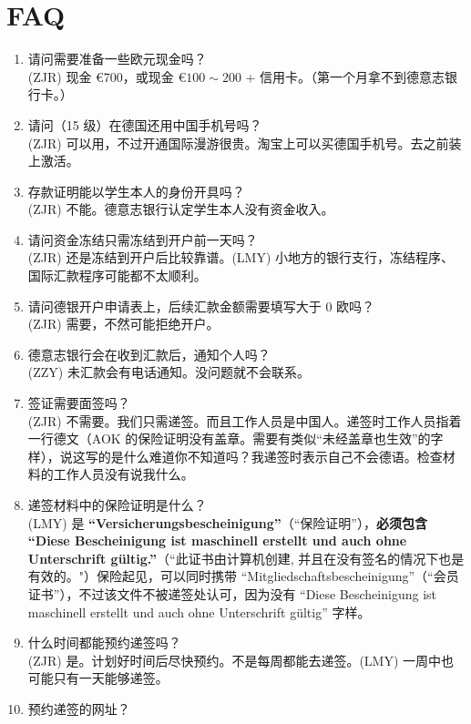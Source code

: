 \documentclass{ctexart}
\begin{document}
\section{FAQ}\label{chap:faq}
\begin{enumerate}
  \item 请问需要准备一些欧元现金吗？ \\
  (ZJR) 现金 \euro{700}，或现金 \euro{$100 \sim 200$} + 信用卡。（第一个月拿不到德意志银行卡。）
  \item 请问（15 级）在德国还用中国手机号吗？ \\
  (ZJR) 可以用，不过开通国际漫游很贵。淘宝上可以买德国手机号。去之前装上激活。
  \item 存款证明能以学生本人的身份开具吗？ \\
  (ZJR) 不能。德意志银行认定学生本人没有资金收入。
  \item 请问资金冻结只需冻结到开户前一天吗？ \\
  (ZJR) 还是冻结到开户后比较靠谱。(LMY) 小地方的银行支行，冻结程序、国际汇款程序可能都不太顺利。
  \item 请问德银开户申请表上，后续汇款金额需要填写大于 0 欧吗？ \\
  (ZJR) 需要，不然可能拒绝开户。
  \item 德意志银行会在收到汇款后，通知个人吗？ \\
  (ZZY) 未汇款会有电话通知。没问题就不会联系。
  \item 签证需要面签吗？ \\
  (ZJR) 不需要。我们只需递签。而且工作人员是中国人。递签时工作人员指着一行德文（AOK 的保险证明没有盖章。需要有类似“未经盖章也生效”的字样），说这写的是什么难道你不知道吗？我递签时表示自己不会德语。检查材料的工作人员没有说我什么。
  \item 递签材料中的保险证明是什么？ \\
  (LMY) 是 \textbf{``Versicherungsbescheinigung''}（“保险证明”），\textbf{必须包含 ``Diese Bescheinigung ist maschinell erstellt und auch ohne Unterschrift gültig.''}（“此证书由计算机创建, 并且在没有签名的情况下也是有效的。"）{\color{gray}保险起见，可以同时携带 ``Mitgliedschaftsbescheinigung''（“会员证书”），不过该文件不被递签处认可，因为没有 ``Diese Bescheinigung ist maschinell erstellt und auch ohne Unterschrift gültig'' 字样。}
  \item 什么时间都能预约递签吗？ \\
  (ZJR) 是。计划好时间后尽快预约。不是每周都能去递签。(LMY) 一周中也可能只有一天能够递签。
  \item 预约递签的网址？ \\

\end{enumerate}
\end{document}
